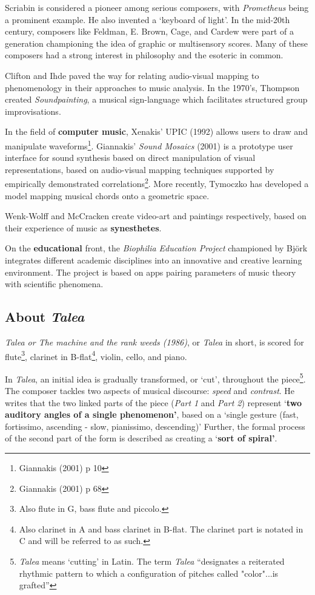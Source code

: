 \documentclass[sigconf]{nimeart}
\begin{document}
Scriabin is considered a pioneer among serious composers, with \emph{Prometheus}\cite{c17} being a prominent example. He also invented a `keyboard of light'\cite{c13}. In the mid-20th century, composers like Feldman, E. Brown, Cage\cite{c18}, and Cardew were part of a generation championing the idea of graphic or multisensory scores\cite{c19}. Many of these composers had a strong interest in philosophy and the esoteric in common.

Clifton\cite{c20} and Ihde\cite{c21} paved the way for relating audio-visual mapping to phenomenology in their approaches to music analysis. In the 1970's, Thompson created \emph{Soundpainting}, a musical sign-language which facilitates structured group improvisations\cite{c22}.~

In the field of \textbf{computer music}, Xenakis' UPIC (1992) allows users to draw and manipulate waveforms\footnote{Giannakis (2001) p 10}. Giannakis' \emph{Sound Mosaics} (2001) \emph{} is a prototype user interface for sound synthesis based on direct manipulation of visual representations, based on audio-visual mapping techniques supported by empirically demonstrated correlations\footnote{Giannakis (2001) p 68}. More recently, Tymoczko has developed a model mapping musical chords onto a geometric space\cite{c23}.

Wenk-Wolff\cite{c24} and McCracken\cite{c25} create video-art and paintings respectively, based on their experience of music as \textbf{synesthetes}.~

On the \textbf{educational} front, the \emph{Biophilia Education Project} championed by Björk integrates different academic disciplines into an innovative and creative learning environment. The project is based on apps pairing parameters of music theory with scientific phenomena\cite{c26}. ~

\subsection{\texorpdfstring{About \emph{Talea}}{About Talea}}\label{about-talea}

\emph{Talea or The machine and the rank weeds (1986)}, or \emph{Talea} in short, is scored for flute\footnote{Also flute in G, bass flute and piccolo.}, clarinet in B-flat\footnote{Also clarinet in A and bass clarinet in B-flat. The clarinet part is notated in C and will be referred to as such.}, violin, cello, and piano.

In \emph{Talea}, an initial idea is gradually transformed, or `cut', throughout the piece\footnote{\emph{Talea} means `cutting' in Latin. The term \emph{Talea} ``designates a reiterated rhythmic pattern to which a configuration of pitches called "color"...is grafted''}. The composer tackles two aspects of musical discourse: \emph{speed} and \emph{contrast}. He writes that the two linked parts of the piece (\emph{Part 1} and \emph{Part 2}) represent `\textbf{two auditory angles of a single phenomenon'}, based on a `single gesture (fast, fortissimo, ascending - slow, pianissimo, descending)' Further, the formal process of the second part of the form is described as creating a `\textbf{sort of spiral'}\cite{c27}.~
\end{document}
